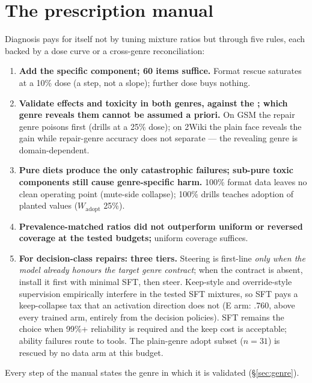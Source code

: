 \section{The prescription manual}
\label{sec:prescription}
Diagnosis pays for itself not by tuning mixture ratios but through five
rules, each backed by a dose curve or a cross-genre reconciliation:
\begin{enumerate}
\item \textbf{Add the specific component; 60 items suffice.} Format rescue
saturates at a 10\% dose (a step, not a slope); further dose buys nothing.
\item \textbf{Validate effects and toxicity in both genres, against the
\prerepair{}; which genre reveals them cannot be assumed a priori.} On GSM the
repair genre poisons first (drills at a 25\% dose); on 2Wiki the plain face
reveals the gain while repair-genre accuracy does not separate --- the revealing
genre is domain-dependent.
\item \textbf{Pure diets produce the only catastrophic failures; sub-pure toxic components still cause genre-specific harm.} 100\% format data
leaves no clean operating point (mute-side collapse); 100\% drills teaches
adoption of planted values ($W_{\text{adopt}}$ 25\%).
\item \textbf{Prevalence-matched ratios did not outperform uniform or
reversed coverage at the tested budgets;} uniform coverage suffices.
\item \textbf{For decision-class repairs: three tiers.} Steering is
first-line \emph{only when the model already honours the target genre
contract}; when the contract is absent, install it first with minimal SFT,
then steer. Keep-style and override-style supervision empirically
interfere in the tested SFT mixtures, so SFT pays a keep-collapse tax that an
activation direction does not (E arm: .760, above every trained arm, entirely
from the decision policies). SFT remains the choice when 99\%+ reliability is
required and the keep cost is acceptable; ability failures route to tools.
The plain-genre adopt subset ($n{=}31$) is rescued by no data arm at this
budget.
\end{enumerate}
Every step of the manual states the genre in which it is validated
(\S\ref{sec:genre}).
